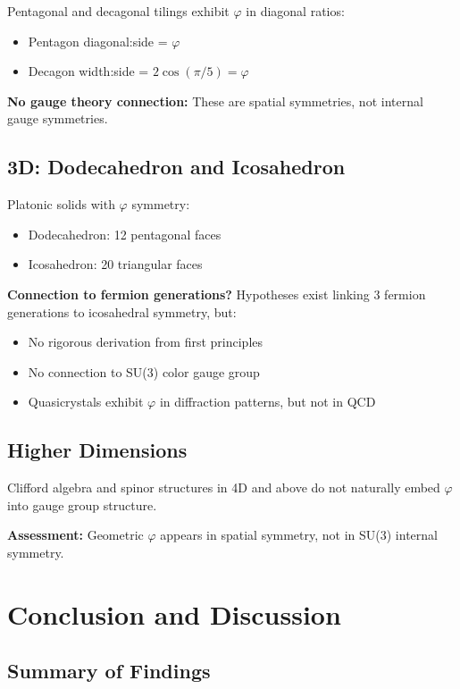 \documentclass{article}
\begin{document}
Pentagonal and decagonal tilings exhibit $\varphi$ in diagonal ratios:
\begin{itemize}
\item Pentagon diagonal:side = $\varphi$
\item Decagon width:side = $2\cos(\pi/5) = \varphi$
\end{itemize}

\textbf{No gauge theory connection:} These are spatial symmetries, not internal gauge symmetries.

\subsection{3D: Dodecahedron and Icosahedron}

Platonic solids with $\varphi$ symmetry:
\begin{itemize}
\item Dodecahedron: 12 pentagonal faces
\item Icosahedron: 20 triangular faces
\end{itemize}

\textbf{Connection to fermion generations?} Hypotheses exist linking 3 fermion generations to icosahedral symmetry, but:
\begin{itemize}
\item No rigorous derivation from first principles
\item No connection to SU(3) color gauge group
\item Quasicrystals exhibit $\varphi$ in diffraction patterns, but not in QCD
\end{itemize}

\subsection{Higher Dimensions}

Clifford algebra and spinor structures in 4D and above do not naturally embed $\varphi$ into gauge group structure.

\textbf{Assessment:} Geometric $\varphi$ appears in spatial symmetry, not in SU(3) internal symmetry.

\section{Conclusion and Discussion}

\subsection{Summary of Findings}
\end{document}
